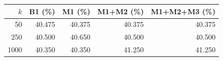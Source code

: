 \begin{table}[t]
\centering
\small
\begin{tabular}{rrrrr}
\toprule
$k$ & B1 (\%) & M1 (\%) & M1+M2 (\%) & M1+M2+M3 (\%) \\
\midrule
50 & 40.475 & 40.375 & 40.375 & 40.375 \\
250 & 40.500 & 40.650 & 40.500 & 40.500 \\
1000 & 40.350 & 40.350 & 41.250 & 41.250 \\
\bottomrule
\end{tabular}
\end{table}
